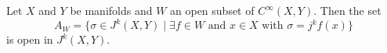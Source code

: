 Let $X$ and $Y$ be manifolds and $W$ an open subset of $C^\infty(X, Y)$. Then the set
$$A_W = \{ \sigma \in J^k(X, Y) \mid \exists f \in W \text{ and } x \in X \text{ with } \sigma = j^k f(x) \}$$
is open in $J^k(X, Y)$.
